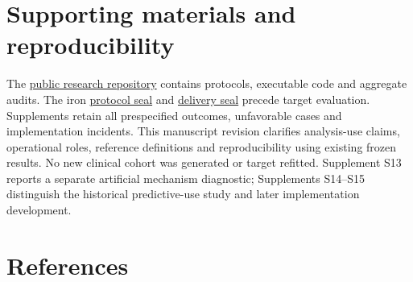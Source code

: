 \documentclass[11pt,letterpaper]{article}
\begin{document}
\section*{Supporting materials and reproducibility}

The \href{https://github.com/ziwang11112/evidence-guided-virtual-cohorts-2026}{public research repository} contains protocols, executable code and aggregate audits. The iron \href{https://github.com/ziwang11112/evidence-guided-virtual-cohorts-2026/commit/bedd845768c1c938768f58fce685f53cbf97f3df}{protocol seal} and \href{https://github.com/ziwang11112/evidence-guided-virtual-cohorts-2026/commit/c88192edeb0bc63b60d0bfe6e3a7282ced9d2975}{delivery seal} precede target evaluation. Supplements retain all prespecified outcomes, unfavorable cases and implementation incidents. This manuscript revision clarifies analysis-use claims, operational roles, reference definitions and reproducibility using existing frozen results. No new clinical cohort was generated or target refitted. Supplement S13 reports a separate artificial mechanism diagnostic; Supplements S14–\allowbreak{}S15 distinguish the historical predictive-use study and later implementation development.


\clearpage

\section*{References}

\begingroup
\end{document}

